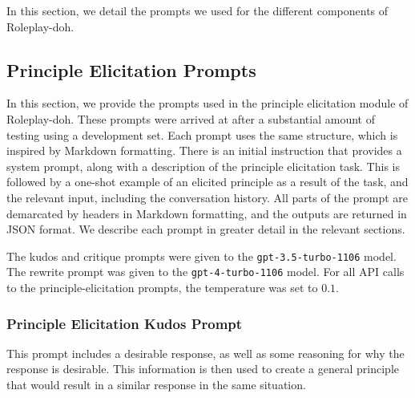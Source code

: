 \documentclass[11pt]{article}
\begin{document}
In this section, we detail the prompts we used for the different components of Roleplay-doh.
\subsection{Principle Elicitation Prompts} \label{sec:principle-elicitation-prompts}
In this section, we provide the prompts used in the principle elicitation module of Roleplay-doh. These prompts were arrived at after a substantial amount of testing using a development set. Each prompt uses the same structure, which is inspired by Markdown formatting. There is an initial instruction that provides a system prompt, along with a description of the principle elicitation task. This is followed by a one-shot example of an elicited principle as a result of the task, and the relevant input, including the conversation history. All parts of the prompt are demarcated by headers in Markdown formatting, and the outputs are returned in JSON format. We describe each prompt in greater detail in the relevant sections.

The kudos and critique prompts were given to the \lstinline{gpt-3.5-turbo-1106} model. The rewrite prompt was given to the \lstinline{gpt-4-turbo-1106} model. For all API calls to the principle-elicitation prompts, the temperature was set to $0.1$.

\subsubsection{Principle Elicitation Kudos Prompt}

This prompt includes a desirable response, as well as some reasoning for why the response is desirable. This information is then used to create a general principle that would result in a similar response in the same situation. 
\end{document}
